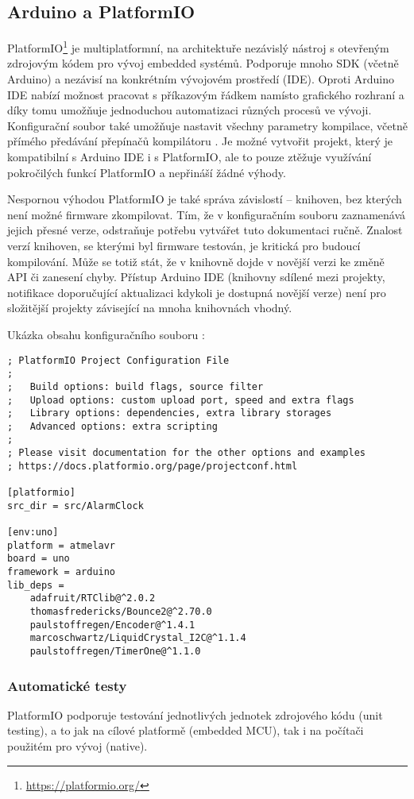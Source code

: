\subsection{Arduino a PlatformIO}

PlatformIO\footnote{\url{https://platformio.org/}} je multiplatformní, na
architektuře nezávislý nástroj s otevřeným zdrojovým kódem pro vývoj embedded
systémů. Podporuje mnoho SDK (včetně Arduino) a nezávisí na konkrétním
vývojovém prostředí (IDE). Oproti Arduino IDE nabízí možnost pracovat
s příkazovým řádkem namísto grafického rozhraní a díky tomu umožňuje
jednoduchou automatizaci různých procesů ve vývoji. Konfigurační soubor
 také umožňuje nastavit všechny parametry kompilace,
včetně přímého předávání přepínačů kompilátoru . Je možné
vytvořit projekt, který je kompatibilní s Arduino IDE i s PlatformIO, ale to
pouze ztěžuje využívání pokročilých funkcí PlatformIO a nepřináší žádné výhody.

Nespornou výhodou PlatformIO je také správa závislostí -- knihoven, bez kterých
není možné firmware zkompilovat. Tím, že v konfiguračním souboru
 zaznamenává jejich přesné verze, odstraňuje potřebu
vytvářet tuto dokumentaci ručně. Znalost verzí knihoven, se kterými byl
firmware testován, je kritická pro budoucí kompilování. Může se totiž stát, že
v knihovně dojde v novější verzi ke změně API či zanesení chyby. Přístup
Arduino IDE (knihovny sdílené mezi projekty, notifikace doporučující
aktualizaci kdykoli je dostupná novější verze) není pro složitější projekty
závisející na mnoha knihovnách vhodný.

Ukázka obsahu konfiguračního souboru :
\begin{lstlisting}
; PlatformIO Project Configuration File
;
;   Build options: build flags, source filter
;   Upload options: custom upload port, speed and extra flags
;   Library options: dependencies, extra library storages
;   Advanced options: extra scripting
;
; Please visit documentation for the other options and examples
; https://docs.platformio.org/page/projectconf.html

[platformio]
src_dir = src/AlarmClock

[env:uno]
platform = atmelavr
board = uno
framework = arduino
lib_deps = 
	adafruit/RTClib@^2.0.2
	thomasfredericks/Bounce2@^2.70.0
	paulstoffregen/Encoder@^1.4.1
	marcoschwartz/LiquidCrystal_I2C@^1.1.4
	paulstoffregen/TimerOne@^1.1.0
\end{lstlisting}


\subsubsection{Automatické testy}
PlatformIO podporuje testování jednotlivých jednotek zdrojového kódu (unit
testing), a to jak na cílové platformě (embedded MCU), tak i na počítači
použitém pro vývoj (native).
